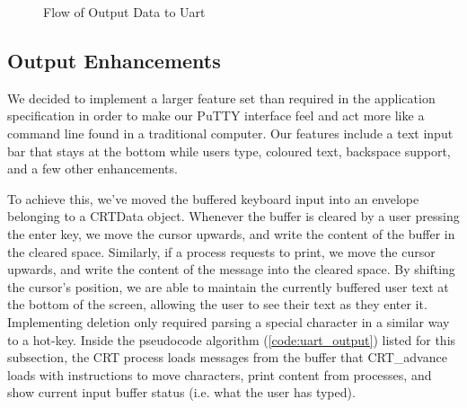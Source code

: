 \documentclass[12pt]{report}
\begin{document}
    \begin{figure}
        \centering
        \label{fig:outputFigure}
        \caption{Flow of Output Data to Uart}
    \end{figure}

\subsection{Output Enhancements}
\label{sec:outputEnhancements}
    We decided to implement a larger feature set than required in the
    application specification in order to make our PuTTY interface feel and act
    more like a command line found in a traditional computer. Our features
    include a text input bar that stays at the bottom while users type, coloured
    text, backspace support, and a few other enhancements.

    To achieve this, we've moved the buffered keyboard input into an envelope
    belonging to a CRTData object. Whenever the buffer is cleared by a
    user pressing the enter key, we move the cursor upwards, and write
    the content of the buffer in the cleared space. Similarly, if a process
    requests to print, we move the cursor upwards, and write the content of the
    message into the cleared space. By shifting the cursor's position, we are
    able to maintain the currently buffered user text at the bottom of the
    screen, allowing the user to see their text as they enter it. Implementing
    deletion only required parsing a special character in a similar way to a
    hot-key. Inside the pseudocode algorithm (\ref{code:uart_output}) listed for
    this subsection, the CRT process loads messages from the buffer that
    CRT\_advance loads with instructions to move characters, print content from
    processes, and show current input buffer status (i.e. what the user has
    typed).
\end{document}
